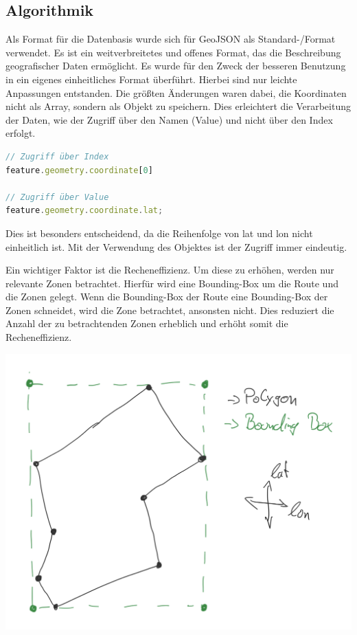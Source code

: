 \subsection*{Algorithmik}

Als Format für die Datenbasis wurde sich für GeoJSON als Standard-/Format verwendet. Es ist ein weitverbreitetes und offenes Format, das die Beschreibung geografischer Daten ermöglicht. Es wurde für den Zweck der besseren Benutzung in ein eigenes einheitliches Format überführt. Hierbei sind nur leichte Anpassungen entstanden. Die größten Änderungen waren dabei, die Koordinaten nicht als Array, sondern als Objekt zu speichern. Dies erleichtert die Verarbeitung der Daten, wie der Zugriff über den Namen (Value) und nicht über den Index erfolgt.

\begin{lstlisting}[caption={Zugriff über Index oder Value},label={lst:replaceCode}, language=javascript]
// Zugriff über Index
feature.geometry.coordinate[0]

// Zugriff über Value
feature.geometry.coordinate.lat;
\end{lstlisting}


Dies ist besonders entscheidend, da die Reihenfolge von lat und lon nicht einheitlich ist. Mit der Verwendung des Objektes ist der Zugriff immer eindeutig.

Ein wichtiger Faktor ist die Recheneffizienz. Um diese zu erhöhen, werden nur relevante Zonen betrachtet. Hierfür wird eine Bounding-Box um die Route und die Zonen gelegt. Wenn die Bounding-Box der Route eine Bounding-Box der Zonen schneidet, wird die Zone betrachtet, ansonsten nicht. Dies reduziert die Anzahl der zu betrachtenden Zonen erheblich und erhöht somit die Recheneffizienz.

\begin{center}
    \includegraphics[width=\columnwidth]{images/boundingbox}
\end{center}

